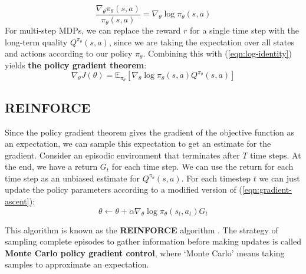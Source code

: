 \documentclass[journal, onecolumn, 12pt, draftclsnofoot]{IEEEtran}
\newcommand{\kword}[1]{\textbf{#1}}
\begin{document}
		\begin{equation}
			\label{eqn:log-identity}
			\frac{\nabla_\theta \pi_\theta (s, a)}{\pi_\theta (s, a)} = \nabla_\theta \log \pi_\theta (s, a)
		\end{equation}
		For multi-step MDPs, we can replace the reward $r$ for a single time step with the long-term quality $Q^{\pi_\theta}(s,a)$, since we are taking the expectation over all states and actions according to our policy $\pi_\theta$. Combining this with (\ref{eqn:log-identity}) yields \kword{the policy gradient theorem}:
		\begin{equation}
			\label{eqn:the-policy-gradient-theorem}
			\nabla_\theta J(\theta) = \mathbb{E}_{\pi_\theta} \left[ \nabla_\theta \log \pi_\theta (s, a) Q^{\pi_\theta}(s,a) \right]
		\end{equation}
		\subsection{REINFORCE}
		\par Since the policy gradient theorem gives the gradient of the objective function as an expectation, we can sample this expectation to get an estimate for the gradient. Consider an episodic environment that terminates after $T$ time steps. At the end, we have a return $G_t$ for each time step. We can use the return for each time step as an unbiased estimate for $Q^{\pi_\theta}(s,a)$. For each timestep $t$ we can just update the policy parameters according to a modified version of (\ref{eqn:gradient-ascent}):
		\begin{equation}
			\label{eqn:reinforce-gradient-ascent}
			\theta \gets \theta + \alpha \nabla_\theta \log \pi_\theta(s_t,a_t)G_t
		\end{equation}
		\par This algorithm is known as the \kword{REINFORCE} algorithm \cite{rl}. The strategy of sampling complete episodes to gather information before making updates is called \kword{Monte Carlo policy gradient control}, where `Monte Carlo' means taking samples to approximate an expectation.
\end{document}
